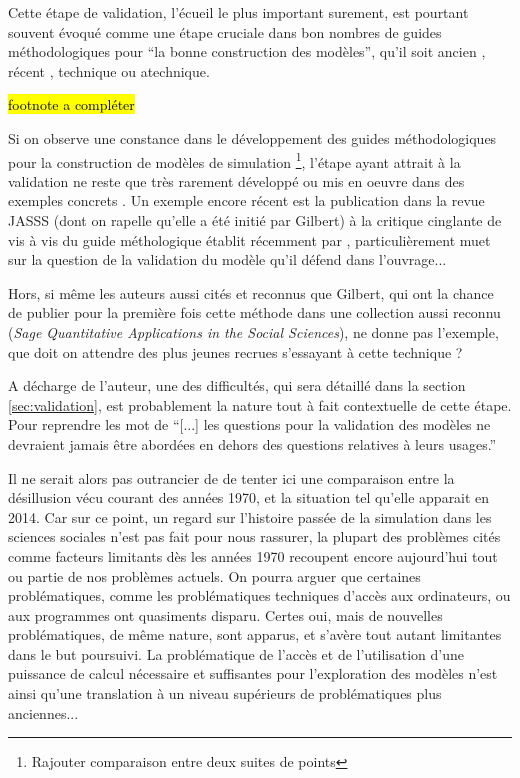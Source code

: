 Cette étape de validation, l'écueil le plus important surement, est pourtant souvent évoqué comme une étape cruciale dans bon nombres de guides méthodologiques pour \enquote{la bonne construction des modèles}, qu'il soit ancien \autocite[195]{Beshers1965} \autocite{Naylor1966, Naylor1967}, récent \autocite{Amblard2006, Gilbert2008}, technique ou atechnique. 


\hl{footnote a compléter}

Si on observe une constance dans le développement des guides méthodologiques pour la construction de modèles de simulation \footnote{Rajouter comparaison entre deux suites de points}, l'étape ayant attrait à la validation ne reste que très rarement développé ou mis en oeuvre dans des exemples concrets . Un exemple encore récent est la publication dans la revue JASSS (dont on rapelle qu'elle a été initié par Gilbert) à la critique cinglante de \autocite{Manzo2007a} vis à vis du guide méthologique établit récemment par \autocite{Gilbert2008}, particulièrement muet sur la question de la validation du modèle qu'il défend dans l'ouvrage... 

Hors, si même les auteurs aussi cités et reconnus que Gilbert, qui ont la chance de publier pour la première fois cette méthode dans une collection aussi reconnu (\textit{Sage Quantitative Applications in the Social Sciences}), ne donne pas l'exemple, que doit on attendre des plus jeunes recrues s'essayant à cette technique ?

A décharge de l'auteur, une des difficultés, qui sera détaillé dans la section \ref{sec:validation}, est probablement la nature tout à fait contextuelle de cette étape. Pour reprendre les mot de \textcite{Amblard2006} \enquote{[...] les questions pour  la validation des modèles ne devraient jamais être abordées en dehors des questions relatives à leurs usages.}

Il ne serait alors pas outrancier de de tenter ici une comparaison entre la désillusion vécu courant des années 1970, et la situation tel qu'elle apparait en 2014. Car sur ce point, un regard sur l'histoire passée de la simulation dans les sciences sociales n'est pas fait pour nous rassurer, la plupart des problèmes cités comme facteurs limitants dès les années 1970 recoupent encore aujourd'hui tout ou partie de nos problèmes actuels. On pourra arguer que certaines problématiques, comme les problématiques techniques d'accès aux ordinateurs, ou aux programmes ont quasiments disparu. Certes oui, mais de nouvelles problématiques, de même nature, sont apparus, et s'avère tout autant limitantes dans le but poursuivi. La problématique de l'accès et de l'utilisation d'une puissance de calcul nécessaire et suffisantes pour l'exploration des modèles n'est ainsi qu'une translation à un niveau supérieurs de problématiques plus anciennes...

